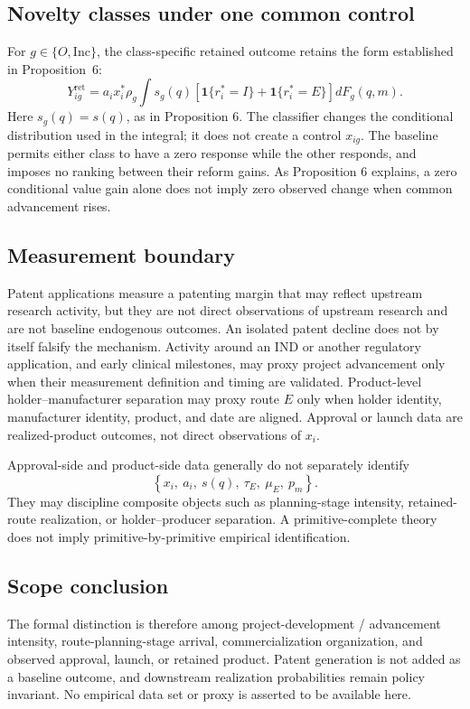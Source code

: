 \subsection{Novelty classes under one common control}
\label{subsec:p09-types}

For \(g\in\{O,\mathrm{Inc}\}\), the class-specific retained outcome retains
the form established in Proposition~6:
\begin{equation}
  Y_{ig}^{\mathrm{ret}}
  =
  a_ix_i^*\rho_g
  \int
  s_g(q)
  \left[
    \mathbf 1\{r_i^*=I\}
    +
    \mathbf 1\{r_i^*=E\}
  \right]
  dF_g(q,m).
  \label{eq:p09-type-mixture}
\end{equation}
Here \(s_g(q)=s(q)\), as in Proposition 6. The classifier changes the
conditional distribution used in the integral; it
does not create a control \(x_{ig}\). The baseline permits either class to
have a zero response while the other responds, and imposes no ranking between
their reform gains. As Proposition 6 explains, a zero conditional value
gain alone does not imply zero observed change when common advancement rises.

\subsection{Measurement boundary}
\label{subsec:p09-measurement}

Patent applications measure a patenting margin that may reflect upstream
research activity, but they are not direct observations of upstream research
and are not baseline endogenous outcomes. An isolated patent decline does not
by itself falsify the mechanism.
Activity around an IND or another regulatory application, and early clinical
milestones, may proxy project advancement only when their measurement definition and
timing are validated.
Product-level holder--manufacturer separation may proxy route \(E\) only when
holder identity, manufacturer identity, product, and date are aligned.
Approval or launch data are realized-product outcomes, not direct observations
of \(x_i\).

Approval-side and product-side data generally do not separately identify
\begin{equation}
  \left\{
    x_i,\ a_i,\ s(q),\ \tau_E,\ \mu_E,\ p_m
  \right\}.
  \label{eq:p09-identification-boundary}
\end{equation}
They may discipline composite objects such as planning-stage intensity,
retained-route realization, or holder--producer separation. A
primitive-complete theory does not imply primitive-by-primitive empirical
identification.

\subsection{Scope conclusion}
\label{subsec:p09-scope}

The formal distinction is therefore among project-development /
advancement intensity, route-planning-stage arrival,
commercialization organization, and observed approval, launch, or retained
product. Patent generation is not added as a baseline outcome, and downstream
realization probabilities remain policy invariant. No empirical data set or
proxy is asserted to be available here.
